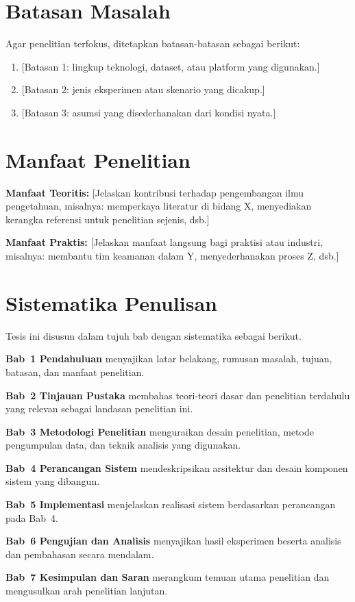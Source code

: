 \section{Batasan Masalah}
\label{sec:1.4}

Agar penelitian terfokus, ditetapkan batasan-batasan sebagai berikut:

\begin{enumerate}
  \item {[Batasan 1: lingkup teknologi, dataset, atau platform yang digunakan.]}
  \item {[Batasan 2: jenis eksperimen atau skenario yang dicakup.]}
  \item {[Batasan 3: asumsi yang disederhanakan dari kondisi nyata.]}
\end{enumerate}

\section{Manfaat Penelitian}
\label{sec:1.5}

\textbf{Manfaat Teoritis:}
[Jelaskan kontribusi terhadap pengembangan ilmu pengetahuan, misalnya: memperkaya literatur
di bidang X, menyediakan kerangka referensi untuk penelitian sejenis, dsb.]

\medskip
\textbf{Manfaat Praktis:}
[Jelaskan manfaat langsung bagi praktisi atau industri, misalnya: membantu tim keamanan
dalam Y, menyederhanakan proses Z, dsb.]

\section{Sistematika Penulisan}
\label{sec:1.6}

Tesis ini disusun dalam tujuh bab dengan sistematika sebagai berikut.

\textbf{Bab~1 Pendahuluan} menyajikan latar belakang, rumusan masalah, tujuan, batasan,
dan manfaat penelitian.

\textbf{Bab~2 Tinjauan Pustaka} membahas teori-teori dasar dan penelitian terdahulu yang
relevan sebagai landasan penelitian ini.

\textbf{Bab~3 Metodologi Penelitian} menguraikan desain penelitian, metode pengumpulan data,
dan teknik analisis yang digunakan.

\textbf{Bab~4 Perancangan Sistem} mendeskripsikan arsitektur dan desain komponen sistem yang
dibangun.

\textbf{Bab~5 Implementasi} menjelaskan realisasi sistem berdasarkan perancangan pada Bab~4.

\textbf{Bab~6 Pengujian dan Analisis} menyajikan hasil eksperimen beserta analisis dan
pembahasan secara mendalam.

\textbf{Bab~7 Kesimpulan dan Saran} merangkum temuan utama penelitian dan mengusulkan arah
penelitian lanjutan.
